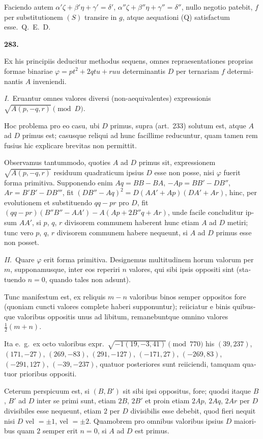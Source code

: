 \documentclass[12pt,a4paper]{article}
\theoremstyle{plain}
\theoremstyle{definition}
\theoremstyle{remark}
\begin{document}
\begin{otherlanguage}{latin}
Faciendo autem $\alpha'\zeta + \beta'\eta + \gamma' = \delta'$, $\alpha''\zeta + \beta''\eta + \gamma'' = \delta''$, nullo negotio patebit, $f$ per substitutionem $(S)$ transire in $g$, atque aequationi (Q) satisfactum esse.~\hfill Q.\ E.\ D.

\bigskip

\textbf{283.}

Ex his principiis deducitur methodus sequens, omnes repraesentationes proprias formae binariae $\varphi = pt^2 + 2qtu + ruu$ determinantis $D$ per ternariam $f$ determinantis $A$ inveniendi.

\textit{I.}\ Eruantur omnes valores diversi (non-aequivalentes) expressionis $\sqrt{A(p, -q, r)} \pmod{D}$.

Hoc problema pro eo casu, ubi $D$ primus, supra (art.\ 233) solutum est, atque $A$ ad $D$ primus est; casusque reliqui ad hunc facillime reducuntur, quam tamen rem fusius hic explicare brevitas non permittit.

Observamus tantummodo, quoties $A$ ad $D$ primus sit, expressionem $\sqrt{A(p, -q, r)}$ residuum quadraticum ipsius $D$ esse non posse, nisi $\varphi$ fuerit forma primitiva. Supponendo enim $Aq = BB - BA$, $-Ap = BB' - DB''$, $Ar = B'B' - DB'''$, fit $(DB'' - Aq)^2 = D(AA' + Ap)(DA' + Ar)$, hinc, per evolutionem et substituendo $qq - pr$ pro $D$, fit $(qq - pr)(B''B'' - AA') - A(Ap + 2B''q + Ar)$, unde facile concluditur ipsum $AA'$, si $p$, $q$, $r$ divisorem communem haberent hunc etiam $A$ ad $D$ metiri; tunc vero $p$, $q$, $r$ divisorem communem habere nequeunt, si $A$ ad $D$ primus esse non posset.

\textit{II.}\ Quare $\varphi$ erit forma primitiva. Designemus multitudinem horum valorum per $m$, supponamusque, inter eos reperiri $n$ valores, qui sibi ipsis oppositi sint (statuendo $n = 0$, quando tales non adsunt).

Tunc manifestum est, ex reliquis $m - n$ valoribus binos semper oppositos fore (quoniam cuncti valores complete haberi supponuntur); reiiciatur e binis quibusque valoribus oppositis unus ad libitum, remanebuntque omnino valores $\frac{1}{2}(m + n)$.

Ita e.\ g.\ ex octo valoribus expr.\ $\sqrt{-1(19, -3, 41)} \pmod{770}$ his $(39, 237)$, $(171, -27)$, $(269, -83)$, $(291, -127)$, $(-171, 27)$, $(-269, 83)$, $(-291, 127)$, $(-39, -237)$, quatuor posteriores sunt reiiciendi, tamquam quatuor prioribus oppositi.

Ceterum perspicuum est, si $(B, B')$ sit sibi ipsi oppositus, fore; quodsi itaque $B$, $B'$ ad $D$ inter se primi sunt, etiam $2B$, $2B'$ et proin etiam $2Ap$, $2Aq$, $2Ar$ per $D$ divisibiles esse nequeunt, etiam $2$ per $D$ divisibilis esse debebit, quod fieri nequit nisi $D$ vel $= \pm 1$, vel $= \pm 2$. Quamobrem pro omnibus valoribus ipsius $D$ maioribus quam $2$ semper erit $n = 0$, si $A$ ad $D$ est primus.


\end{otherlanguage}
\end{document}
